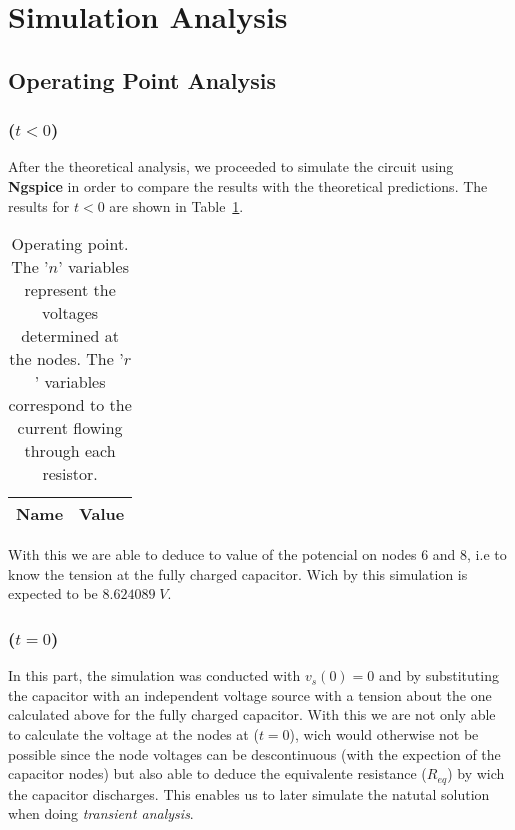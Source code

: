 \newpage

\section{Simulation Analysis}
\label{sec:simulation}

\subsection{Operating Point Analysis}
\label{sec:op_point}

\subsubsection{($t < 0$)}

After the theoretical analysis, we proceeded to simulate the circuit using {\bf Ngspice} in order to compare the results with the theoretical predictions. The results for $t < 0$ are shown in Table~\ref{tab:op1}.

\begin{table}[H]
	\centering
	\begin{tabular}{|l|c|}
		\hline    
		    {\bf Name} & {\bf Value} \\
                    \hline
                    \hline
		
	\end{tabular}
	\caption{Operating point. The '$n$' variables represent the voltages determined at the nodes. The '$r$' variables correspond to the current flowing through each resistor.}
	\label{tab:op1}
\end{table}

\par With this we are able to deduce to value of the potencial on nodes 6 and 8, i.e to know the tension at the fully charged capacitor. Wich by this simulation is expected to be $8.624089\;V$.

\subsubsection{($t = 0$)}

In this part, the simulation was conducted with $v_s(0) = 0$ and by substituting the capacitor with an independent voltage source with a tension about the one calculated above for the fully charged capacitor. With this we are not only able to calculate the voltage at the nodes at ($t = 0$), wich would otherwise not be possible since the node voltages can be descontinuous (with the expection of the capacitor nodes) but also able to deduce the equivalente resistance ($R_{eq}$) by wich the capacitor discharges. This enables us to later simulate the natutal solution when doing \emph{transient analysis}.

